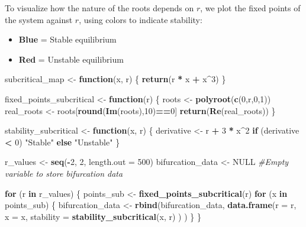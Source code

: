 \documentclass[
]{article}
\newenvironment{Shaded}{\begin{snugshade}}{\end{snugshade}}
\newcommand{\AttributeTok}[1]{\textcolor[rgb]{0.13,0.29,0.53}{#1}}
\newcommand{\CommentTok}[1]{\textcolor[rgb]{0.56,0.35,0.01}{\textit{#1}}}
\newcommand{\ConstantTok}[1]{\textcolor[rgb]{0.56,0.35,0.01}{#1}}
\newcommand{\ControlFlowTok}[1]{\textcolor[rgb]{0.13,0.29,0.53}{\textbf{#1}}}
\newcommand{\DecValTok}[1]{\textcolor[rgb]{0.00,0.00,0.81}{#1}}
\newcommand{\FunctionTok}[1]{\textcolor[rgb]{0.13,0.29,0.53}{\textbf{#1}}}
\newcommand{\NormalTok}[1]{#1}
\newcommand{\OtherTok}[1]{\textcolor[rgb]{0.56,0.35,0.01}{#1}}
\newcommand{\SpecialCharTok}[1]{\textcolor[rgb]{0.81,0.36,0.00}{\textbf{#1}}}
\newcommand{\StringTok}[1]{\textcolor[rgb]{0.31,0.60,0.02}{#1}}
\providecommand{\tightlist}{%
  \setlength{\itemsep}{0pt}\setlength{\parskip}{0pt}}
\begin{document}
To visualize how the nature of the roots depends on \(r\), we plot the
fixed points of the system against \(r\), using colors to indicate
stability:

\begin{itemize}
\tightlist
\item
  \textbf{Blue} = Stable equilibrium
\item
  \textbf{Red} = Unstable equilibrium
\end{itemize}

\begin{Shaded}
\begin{Highlighting}[]
\NormalTok{subcritical\_map }\OtherTok{\textless{}{-}} \ControlFlowTok{function}\NormalTok{(x, r) \{}
  \FunctionTok{return}\NormalTok{(r }\SpecialCharTok{*}\NormalTok{ x }\SpecialCharTok{+}\NormalTok{ x}\SpecialCharTok{\^{}}\DecValTok{3}\NormalTok{)}
\NormalTok{\}}

\NormalTok{fixed\_points\_subcritical }\OtherTok{\textless{}{-}} \ControlFlowTok{function}\NormalTok{(r) \{}
\NormalTok{  roots }\OtherTok{\textless{}{-}} \FunctionTok{polyroot}\NormalTok{(}\FunctionTok{c}\NormalTok{(}\DecValTok{0}\NormalTok{,r,}\DecValTok{0}\NormalTok{,}\DecValTok{1}\NormalTok{))}
\NormalTok{  real\_roots }\OtherTok{\textless{}{-}}\NormalTok{ roots[}\FunctionTok{round}\NormalTok{(}\FunctionTok{Im}\NormalTok{(roots),}\DecValTok{10}\NormalTok{)}\SpecialCharTok{==}\DecValTok{0}\NormalTok{]}
  \FunctionTok{return}\NormalTok{(}\FunctionTok{Re}\NormalTok{(real\_roots))}
\NormalTok{\}}

\NormalTok{stability\_subcritical }\OtherTok{\textless{}{-}} \ControlFlowTok{function}\NormalTok{(x, r) \{}
\NormalTok{  derivative }\OtherTok{\textless{}{-}}\NormalTok{ r }\SpecialCharTok{+} \DecValTok{3} \SpecialCharTok{*}\NormalTok{ x}\SpecialCharTok{\^{}}\DecValTok{2}
  \ControlFlowTok{if}\NormalTok{ (derivative }\SpecialCharTok{\textless{}} \DecValTok{0}\NormalTok{) }\StringTok{"Stable"} \ControlFlowTok{else} \StringTok{"Unstable"}
\NormalTok{\}}

\NormalTok{r\_values }\OtherTok{\textless{}{-}} \FunctionTok{seq}\NormalTok{(}\SpecialCharTok{{-}}\DecValTok{2}\NormalTok{, }\DecValTok{2}\NormalTok{, }\AttributeTok{length.out =} \DecValTok{500}\NormalTok{)}
\NormalTok{bifurcation\_data }\OtherTok{\textless{}{-}} \ConstantTok{NULL} \CommentTok{\#Empty variable to store bifurcation data}

\ControlFlowTok{for}\NormalTok{ (r }\ControlFlowTok{in}\NormalTok{ r\_values) \{}
\NormalTok{  points\_sub }\OtherTok{\textless{}{-}} \FunctionTok{fixed\_points\_subcritical}\NormalTok{(r)}
  \ControlFlowTok{for}\NormalTok{ (x }\ControlFlowTok{in}\NormalTok{ points\_sub) \{}
\NormalTok{    bifurcation\_data }\OtherTok{\textless{}{-}} \FunctionTok{rbind}\NormalTok{(bifurcation\_data, }
                              \FunctionTok{data.frame}\NormalTok{(}\AttributeTok{r =}\NormalTok{ r, }
                                         \AttributeTok{x =}\NormalTok{ x, }
                                         \AttributeTok{stability =} \FunctionTok{stability\_subcritical}\NormalTok{(x, r)}
\NormalTok{                                         )}
\NormalTok{                              )}
\NormalTok{  \}}
\NormalTok{\}}


\end{Highlighting}
\end{Shaded}
\end{document}
